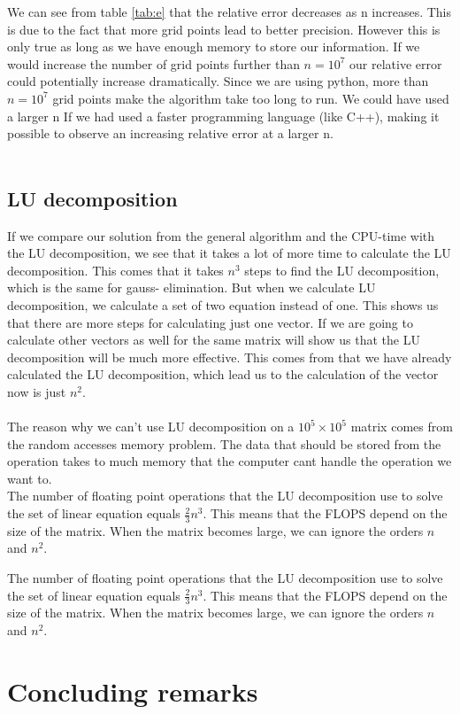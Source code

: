 \documentclass[norsk,a4paper,12pt]{article}
\begin{document}
 
 We can see from table \ref{tab:e} that the relative error decreases as n increases. This is due to the fact that more grid points lead to better precision. However this is only true as long as we have enough memory to store our information. If we would increase the number of grid points further than $n=10^7$ our relative error could potentially increase dramatically. Since we are using python, more than $n=10^7$ grid points make the algorithm take too long to run. We could have used a larger n If we had used a faster programming language (like C++), making it possible to observe an increasing relative error at a larger n.\\
 \\
 \subsection{LU decomposition}
  If we compare our solution from the general algorithm and the CPU-time with the LU decomposition, we see that it takes a lot of more time to calculate the LU decomposition. This comes that it takes $n^3$ steps to find the LU decomposition, which is the same for gauss- elimination. But when we calculate LU decomposition, we calculate a set of two equation instead of one. This shows us that there are more steps for calculating just one vector. If we are going to calculate other vectors as well for the same matrix will show us that the LU decomposition will be much more effective. This comes from that we have already calculated the LU decomposition, which lead us to the calculation of the vector now is just $n^2$.    
\\
\\
The reason why we can’t use LU decomposition on a $10^5 \times 10^5$ matrix comes from the random accesses memory problem. The data that should be stored from the operation takes to much memory that the computer cant handle the operation we want to.  
\\

The number of floating point operations that the LU decomposition use to solve the set of linear equation equals $\frac{2}{3} n^3$. This means that the FLOPS depend on the size of the matrix. When the matrix becomes large, we can ignore the orders $n$ and $n^2$.     
  

The number of floating point operations that the LU decomposition use to solve the set of linear equation equals $\frac{2}{3} n^3$. This means that the FLOPS depend on the size of the matrix. When the matrix becomes large, we can ignore the orders $n$ and $n^2$.        

  
\section{Concluding remarks}





\end{document}
